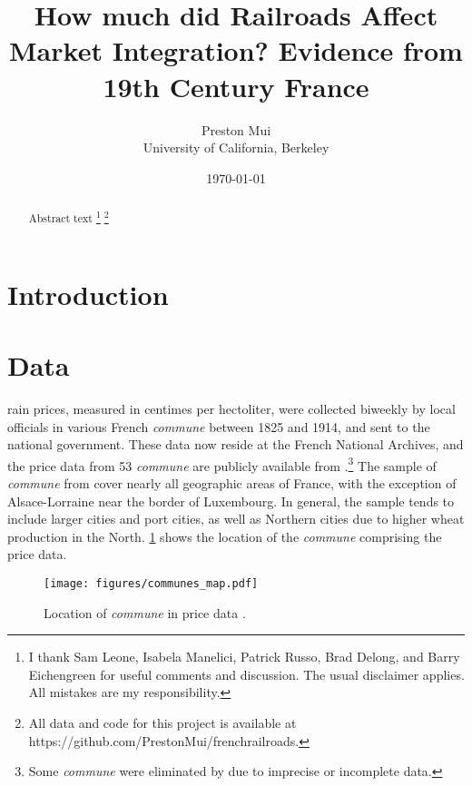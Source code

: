 \documentclass[12pt,twoside]{article}
\title{How much did Railroads Affect Market Integration? Evidence from 19th Century France}
\date{\today}
\author{Preston Mui \\ University of California, Berkeley}
\begin{document}
\maketitle

\begin{abstract}
   Abstract text
   \footnote{I thank Sam Leone, Isabela Manelici, Patrick Russo, Brad Delong, and Barry Eichengreen for useful comments and discussion. The usual disclaimer applies. All mistakes are my responsibility.}
   \footnote{All data and code for this project is available at https://github.com/PrestonMui/frenchrailroads.}
\end{abstract}

\newpage
\section{Introduction}

\section{Data}

rain prices, measured in centimes per hectoliter, were collected biweekly by local officials in various French \emph{commune} between 1825 and 1914, and sent to the national government.
These data now reside at the French National Archives, and the price data from 53 \emph{commune} are publicly available from \cite{prices}.\footnote{Some \emph{commune} were eliminated by \cite{prices} due to imprecise or incomplete data.}
The sample of \emph{commune} from \cite{prices} cover nearly all geographic areas of France, with the exception of Alsace-Lorraine near the border of Luxembourg.
In general, the sample tends to include larger cities and port cities, as well as Northern cities due to higher wheat production in the North.
\ref{fig:communes_map} shows the location of the \emph{commune} comprising the price data.

\begin{figure}[h]
	\centering
	\texttt{[image: figures/communes\_map.pdf]}
	\caption{Location of \emph{commune} in price data \citep{prices}.}
	\label{fig:communes_map}
\end{figure}

\end{document}
